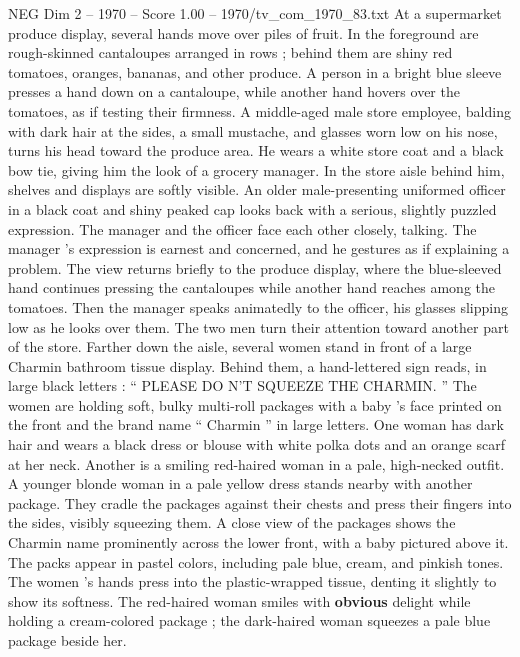 \begin{textsample}{NEG Dim 2 – 1970 – Score 1.00 – 1970/tv\_com\_1970\_83.txt}  \label{ex:f2_neg_027}
At a supermarket produce display, several hands move over piles of fruit.
In the foreground are rough-skinned cantaloupes arranged in rows ; behind them are shiny red tomatoes, oranges, bananas, and other produce.
A person in a bright blue sleeve presses a hand down on a cantaloupe, while another hand hovers over the tomatoes, as if testing their firmness.
A middle-aged male store employee, balding with dark hair at the sides, a small mustache, and glasses worn low on his nose, turns his head toward the produce area.
He wears a white store coat and a black bow tie, giving him the look of a grocery manager.
In the store aisle behind him, shelves and displays are softly visible.
An older male-presenting uniformed officer in a black coat and shiny peaked cap looks back with a serious, slightly puzzled expression.
The manager and the officer face each other closely, talking.
The manager ’s expression is earnest and concerned, and he gestures as if explaining a problem.
The view returns briefly to the produce display, where the blue-sleeved hand continues pressing the cantaloupes while another hand reaches among the tomatoes.
Then the manager speaks animatedly to the officer, his glasses slipping low as he looks over them.
The two men turn their attention toward another part of the store.
Farther down the aisle, several women stand in front of a large Charmin bathroom tissue display.
Behind them, a hand-lettered sign reads, in large black letters : “ PLEASE DO N’T SQUEEZE THE CHARMIN. ” The women are holding soft, bulky multi-roll packages with a baby ’s face printed on the front and the brand name “ Charmin ” in large letters.
One woman has dark hair and wears a black dress or blouse with white polka dots and an orange scarf at her neck.
Another is a smiling red-haired woman in a pale, high-necked outfit.
A younger blonde woman in a pale yellow dress stands nearby with another package.
They cradle the packages against their chests and press their fingers into the sides, visibly squeezing them.
A close view of the packages shows the Charmin name prominently across the lower front, with a baby pictured above it.
The packs appear in pastel colors, including pale blue, cream, and pinkish tones.
The women ’s hands press into the plastic-wrapped tissue, denting it slightly to show its softness.
The red-haired woman smiles with \textbf{obvious} delight while holding a cream-colored package ; the dark-haired woman squeezes a pale blue package beside her.

\end{textsample}
